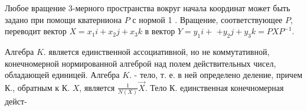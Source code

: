 \documentclass[10pt]{article}
\begin{document}
Любое вращение 3-мерного пространства вокруг начала координат может быть задано при помощи кватерниона $P$ с нормой 1 . Вращение, соответствующее $P$, переводит вектор $X=x_{1} i+x_{2} j+x_{3} k$ в вектор $Y=y_{1} i+$ $+y_{2} j+y_{3} k=P X P^{-1}$.



Алгебра $K$. является единственной ассоциативной, но не коммутативной, конечномерной нормированной алгеброй над полем действительных чисел, обладающей единицей. Алгебра $K$. - тело, т. е. в ней определено деление, причем К., обратным к К. $X$, является $\frac{1}{N(X)} \vec{X}$. Тело К. единственная конечномерная дейст-
\end{document}
